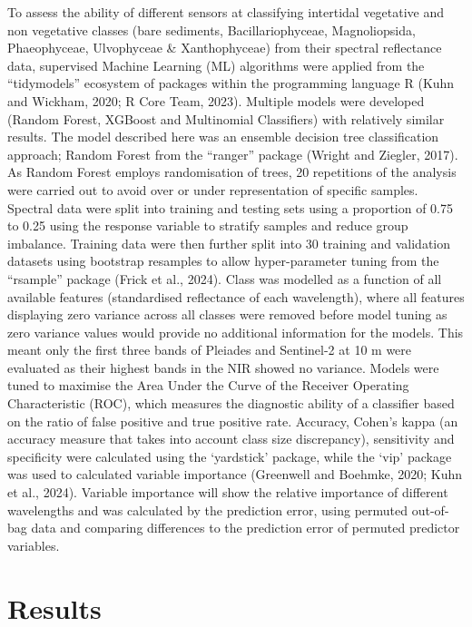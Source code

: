 \documentclass[
  letterpaper,
  11pt,
  english,
  singlespacing,
  headsepline]{MastersDoctoralThesis}
\begin{document}
\begin{spacing}{1.5}
To assess the ability of different sensors at classifying intertidal
vegetative and non vegetative classes (bare sediments,
Bacillariophyceae, Magnoliopsida, Phaeophyceae, Ulvophyceae \&
Xanthophyceae) from their spectral reflectance data, supervised Machine
Learning (ML) algorithms were applied from the ``tidymodels'' ecosystem
of packages within the programming language R (Kuhn and Wickham, 2020; R
Core Team, 2023). Multiple models were developed (Random Forest, XGBoost
and Multinomial Classifiers) with relatively similar results. The model
described here was an ensemble decision tree classification approach;
Random Forest from the ``ranger'' package (Wright and Ziegler, 2017). As
Random Forest employs randomisation of trees, 20 repetitions of the
analysis were carried out to avoid over or under representation of
specific samples. Spectral data were split into training and testing
sets using a proportion of 0.75 to 0.25 using the response variable to
stratify samples and reduce group imbalance. Training data were then
further split into 30 training and validation datasets using bootstrap
resamples to allow hyper-parameter tuning from the ``rsample'' package
(Frick et al., 2024). Class was modelled as a function of all available
features (standardised reflectance of each wavelength), where all
features displaying zero variance across all classes were removed before
model tuning as zero variance values would provide no additional
information for the models. This meant only the first three bands of
Pleiades and Sentinel-2 at 10 m were evaluated as their highest bands in
the NIR showed no variance. Models were tuned to maximise the Area Under
the Curve of the Receiver Operating Characteristic (ROC), which measures
the diagnostic ability of a classifier based on the ratio of false
positive and true positive rate. Accuracy, Cohen's kappa (an accuracy
measure that takes into account class size discrepancy), sensitivity and
specificity were calculated using the `yardstick' package, while the
`vip' package was used to calculated variable importance (Greenwell and
Boehmke, 2020; Kuhn et al., 2024). Variable importance will show the
relative importance of different wavelengths and was calculated by the
prediction error, using permuted out-of-bag data and comparing
differences to the prediction error of permuted predictor variables.

\section{Results}\label{results}


\end{spacing}
\end{document}

